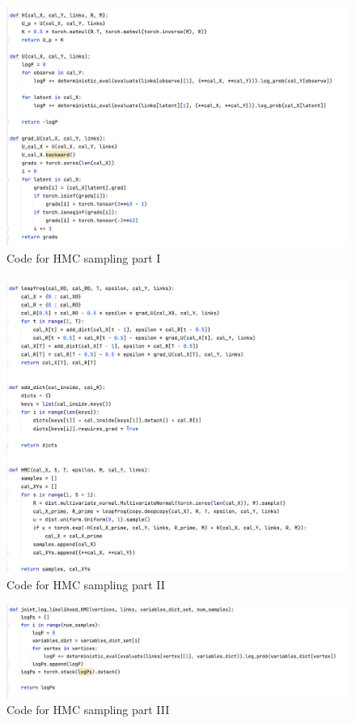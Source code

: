 \documentclass{article}
\begin{document}
\begin{enumerate}
\begin{figure}
	\centering
	\includegraphics[scale=0.6]{../figs/HMC_1}
	\caption{Code for HMC sampling part I}
\end{figure}

\begin{figure}
	\centering
	\includegraphics[scale=0.6]{../figs/HMC_2}
	\caption{Code for HMC sampling part II}
\end{figure}

\begin{figure}
	\centering
	\includegraphics[scale=0.5]{../figs/HMC_3}
	\caption{Code for HMC sampling part III}
\end{figure}

\end{enumerate}
\end{document}
